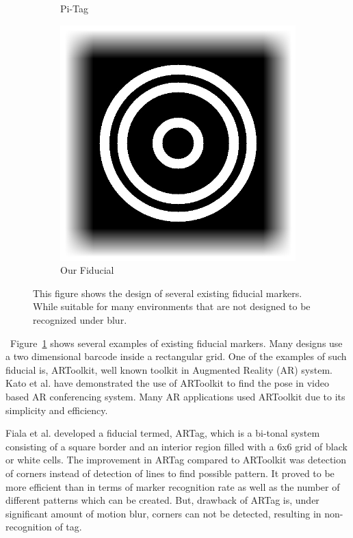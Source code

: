 \documentclass[runningheads]{llncs}
\begin{document}
\begin{figure}
\begin{subfigure}[b]{0.19\textwidth}
  Pi-Tag\cite{Pitag13}
 \end{subfigure}
 \begin{subfigure}[b]{0.19\textwidth}
  \centering
  \includegraphics[width=\linewidth]{our_fiducial}
  Our Fiducial
 \end{subfigure}
 \caption{This figure shows the design of several existing fiducial markers.  While
 suitable for many environments that are not designed to be recognized under blur.}
 \label{fig:previous_work}
\end{figure}

~Figure~\ref{fig:previous_work} shows several examples
of existing fiducial markers.  Many designs use a two dimensional barcode inside a rectangular grid. One of the examples of such fiducial is, ARToolkit\cite{ARToolkit02}, well known toolkit in Augmented Reality (AR) system. Kato et al.\cite{kato-artoolkit} have demonstrated the use of ARToolkit to find the pose in video based AR conferencing system. Many AR applications used
ARToolkit due to its simplicity and efficiency.

Fiala et al. \cite{Fiala05} developed a fiducial termed, ARTag, which is a
bi-tonal system consisting of a square border and an interior region filled
with a 6x6 grid of black or white cells. The improvement in ARTag compared to
ARToolkit was detection of corners instead of detection of lines to find
possible pattern. It proved to be more efficient than \cite{ARToolkit02} in
terms of marker recognition rate as well as the number of different patterns
which can be created. But, drawback of ARTag is, under significant amount of
motion blur, corners can not be detected, resulting in non-recognition of tag.
\end{document}

